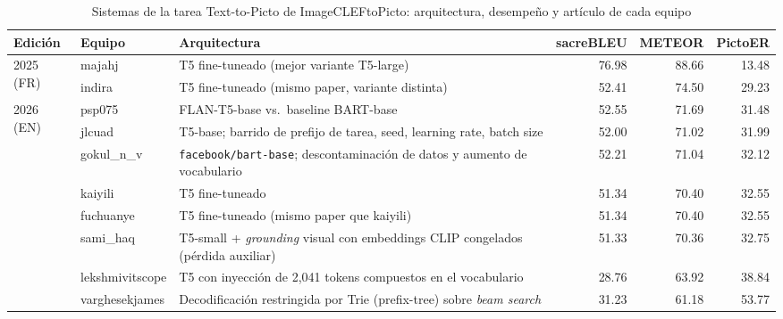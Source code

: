 \begin{landscape}

\begin{table}[H]
\centering
\caption{Sistemas de la tarea Text-to-Picto de ImageCLEFtoPicto: arquitectura, desempeño y artículo de cada equipo\protect\footnotemark}
\label{tab:sota-text-to-picto}
\small
\begin{tabular}{@{}llp{5.8cm}rrr@{}}
\toprule
\textbf{Edición} & \textbf{Equipo} & \textbf{Arquitectura} & \textbf{sacreBLEU} & \textbf{METEOR} & \textbf{PictoER} \\
\midrule
\multirow{2}{*}{2025 (FR)}
 & majahj & T5 fine-tuneado (mejor variante T5-large) \cite{Hjuler2025Parlez} & 76.98 & 88.66 & 13.48 \\
 & indira & T5 fine-tuneado (mismo paper, variante distinta) \cite{Hjuler2025Parlez} & 52.41 & 74.50 & 29.23 \\
\midrule
\multirow{9}{*}{2026 (EN)}
 & psp075          & FLAN-T5-base vs.\ baseline BART-base  & 52.55 & 71.69 & 31.48 \\
 & jlcuad          & T5-base; barrido de prefijo de tarea, seed, learning rate, batch size  & 52.00 & 71.02 & 31.99 \\
 & gokul\_n\_v     & \texttt{facebook/bart-base}; descontaminaci\'on de datos y aumento de vocabulario  & 52.21 & 71.04 & 32.12 \\
 & kaiyili         & T5 fine-tuneado  & 51.34 & 70.40 & 32.55 \\
 & fuchuanye       & T5 fine-tuneado (mismo paper que kaiyili)  & 51.34 & 70.40 & 32.55 \\
 & sami\_haq       & T5-small + \textit{grounding} visual con embeddings CLIP congelados (p\'erdida auxiliar)  & 51.33 & 70.36 & 32.75 \\
  & lekshmivitscope & T5 con inyecci\'on de 2{,}041 tokens compuestos en el vocabulario & 28.76 & 63.92 & 38.84 \\
 & varghesekjames  & Decodificaci\'on restringida por Trie (prefix-tree) sobre \textit{beam search}  & 31.23 & 61.18 & 53.77 \\
\bottomrule
\end{tabular}
\end{table}
\end{landscape}

